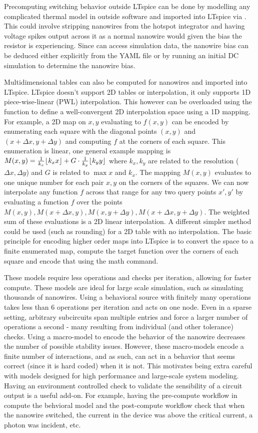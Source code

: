Precomputing switching behavior outside LTspice can be done by modelling any complicated thermal
model in outside software and imported into LTspice via . This could involve stripping
nanowires from the hotspot integrator and having voltage spikes output across it as a normal
nanowire would given the bias the resistor is experiencing. Since  can access
simulation data, the nanowire bias can be deduced either explicitly from the YAML file or by
running an initial DC simulation to determine the nanowire bias.

Multidimensional tables can also be computed for nanowires and imported into LTspice. LTspice doesn't
support 2D tables or interpolation, it only supports 1D piece-wise-linear (PWL) interpolation. This
however can be overloaded using the  function to define a well-convergent 2D interpolation 
space using a 1D mapping. For example, a 2D map on $x, y$ evaluating to $f(x, y)$ can be encoded 
by enumerating each square with the diagonal points $(x, y)$ and $(x+\Delta x, y + \Delta y)$ and 
computing $f$ at the corners of each square. This
enumeration is linear, one general example mapping is $M(x, y) = \frac{1}{k_x}\lfloor k_xx\rfloor+G\cdot \frac{1}{k_y}\lfloor k_yy\rfloor$ where
$k_x, k_y$ are related to the resolution ($\Delta x, \Delta y$) and $G$ is related to $\max{x}$
and $k_x$. 
The mapping $M(x, y)$ evaluates to one unique number for each pair $x, y$ on the corners
of the squares. We can now interpolate any function $f$ across that range for any two query points 
$x', y'$ by evaluating
a function $f$ over the points $M(x, y), M(x+\Delta x, y), M(x, y+\Delta y), M(x+\Delta x, y+\Delta y)$.
The weighted sum of these evaluations is a 2D linear interpolation. A different simpler method could be
used (such as rounding) for a 2D table with no interpolation. The basic principle for encoding higher 
order maps into LTspice is to convert
the space to a finite enumerated map, compute the target function over the corners of each square and
encode that using the  math command. 

These models require less operations and checks per iteration, allowing for faster compute. 
These models are ideal for large scale simulation, such as simulating thousands of nanowires.
Using
a behavioral source with finitely many operations takes less than 6 operations per iteration and
acts on one node. Even in a sparse setting, arbitrary subcircuits span multiple entries and force
a larger number of operations a second - many resulting from individual  (and other tolerance)
checks. Using a macro-model to encode the behavior of the nanowire decreases the number of possible
stability issues. However, these macro-models encode a finite number of interactions, and as such, can 
act in a behavior that seems correct (since it is hard coded) when it is not. This motivates being
extra careful with models designed for high performance and large-scale system modeling. Having an
environment controlled check to validate the sensibility of a circuit output is a useful add-on. For
example, having the pre-compute workflow in  compute the behvioral model and the
post-compute workflow check that when the nanowire switched, the current in the device was above
the critical current, a photon was incident, etc. 